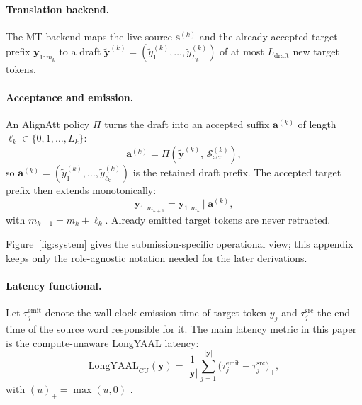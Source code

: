 \documentclass[11pt]{article}
\begin{document}
\paragraph{Translation backend.}
The MT backend maps the live source $\mathbf{s}^{(k)}$ and the already
accepted target prefix $\mathbf{y}_{1:m_k}$ to a draft
$\widetilde{\mathbf{y}}^{(k)} =
(\widetilde{y}^{(k)}_1, \ldots, \widetilde{y}^{(k)}_{L_k})$ of at most
$L_{\mathrm{draft}}$ new target tokens.

\paragraph{Acceptance and emission.}
An AlignAtt policy $\Pi$ turns the draft into an accepted suffix
$\mathbf{a}^{(k)}$ of length $\ell_k \in \{0,1,\ldots,L_k\}$:
\begin{equation}
  \mathbf{a}^{(k)} = \Pi\!\left(
    \widetilde{\mathbf{y}}^{(k)},\, \mathcal{S}^{(k)}_{\mathrm{acc}}
  \right),
  \label{eq:accept-prefix}
\end{equation}
so $\mathbf{a}^{(k)} =
(\widetilde{y}^{(k)}_1, \ldots, \widetilde{y}^{(k)}_{\ell_k})$ is the retained
draft prefix. The accepted target prefix then extends monotonically:
\begin{equation}
  \mathbf{y}_{1:m_{k+1}} =
  \mathbf{y}_{1:m_k} \,\Vert\, \mathbf{a}^{(k)},
  \label{eq:monotone}
\end{equation}
with $m_{k+1} = m_k + \ell_k$. Already emitted target tokens are never
retracted.

Figure~\ref{fig:system} gives the submission-specific operational view; this
appendix keeps only the role-agnostic notation needed for the later
derivations.

\paragraph{Latency functional.}
Let $\tau^{\mathrm{emit}}_j$ denote the wall-clock emission time of target
token $y_j$ and $\tau^{\mathrm{src}}_j$ the end time of the source word
responsible for it. The main latency metric in this paper is the
compute-unaware LongYAAL latency:
\begin{equation}
  \mathrm{LongYAAL}_{\mathrm{CU}}(\mathbf{y})
  = \frac{1}{|\mathbf{y}|} \sum_{j=1}^{|\mathbf{y}|}
  \bigl(\tau^{\mathrm{emit}}_j - \tau^{\mathrm{src}}_j\bigr)_+,
  \label{eq:lya-cu}
\end{equation}
with $(u)_+ = \max(u,0)$ \citep{longyaal25}.
\end{document}
